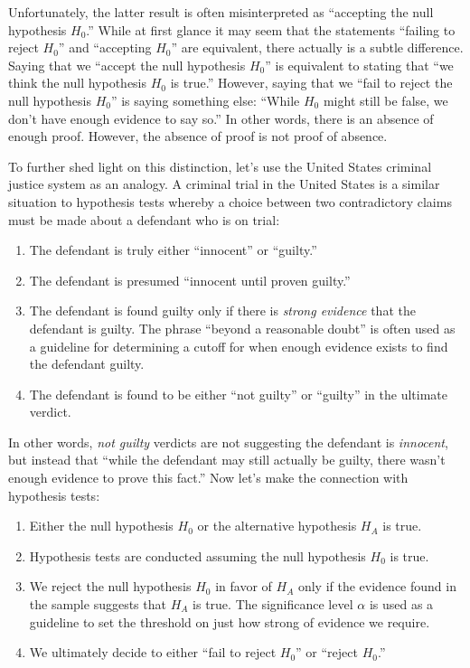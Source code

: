 \documentclass[
]{book}
\providecommand{\tightlist}{%
  \setlength{\itemsep}{0pt}\setlength{\parskip}{0pt}}
\begin{document}
Unfortunately, the latter result is often misinterpreted as ``accepting the null hypothesis \(H_0\).'' While at first glance it may seem that the statements ``failing to reject \(H_0\)'' and ``accepting \(H_0\)'' are equivalent, there actually is a subtle difference. Saying that we ``accept the null hypothesis \(H_0\)'' is equivalent to stating that ``we think the null hypothesis \(H_0\) is true.'' However, saying that we ``fail to reject the null hypothesis \(H_0\)'' is saying something else: ``While \(H_0\) might still be false, we don't have enough evidence to say so.'' In other words, there is an absence of enough proof. However, the absence of proof is not proof of absence.

To further shed light on this distinction,  let's use the United States criminal justice system as an analogy. A criminal trial in the United States is a similar situation to hypothesis tests whereby a choice between two contradictory claims must be made about a defendant who is on trial:

\begin{enumerate}
\def\labelenumi{\arabic{enumi}.}
\tightlist
\item
  The defendant is truly either ``innocent'' or ``guilty.''
\item
  The defendant is presumed ``innocent until proven guilty.''
\item
  The defendant is found guilty only if there is \emph{strong evidence} that the defendant is guilty. The phrase ``beyond a reasonable doubt'' is often used as a guideline for determining a cutoff for when enough evidence exists to find the defendant guilty.
\item
  The defendant is found to be either ``not guilty'' or ``guilty'' in the ultimate verdict.
\end{enumerate}

In other words, \emph{not guilty} verdicts are not suggesting the defendant is \emph{innocent}, but instead that ``while the defendant may still actually be guilty, there wasn't enough evidence to prove this fact.'' Now let's make the connection with hypothesis tests:

\begin{enumerate}
\def\labelenumi{\arabic{enumi}.}
\tightlist
\item
  Either the null hypothesis \(H_0\) or the alternative hypothesis \(H_A\) is true.
\item
  Hypothesis tests are conducted assuming the null hypothesis \(H_0\) is true.
\item
  We reject the null hypothesis \(H_0\) in favor of \(H_A\) only if the evidence found in the sample suggests that \(H_A\) is true. The significance level \(\alpha\) is used as a guideline to set the threshold on just how strong of evidence we require.
\item
  We ultimately decide to either ``fail to reject \(H_0\)'' or ``reject \(H_0\).''
\end{enumerate}
\end{document}
